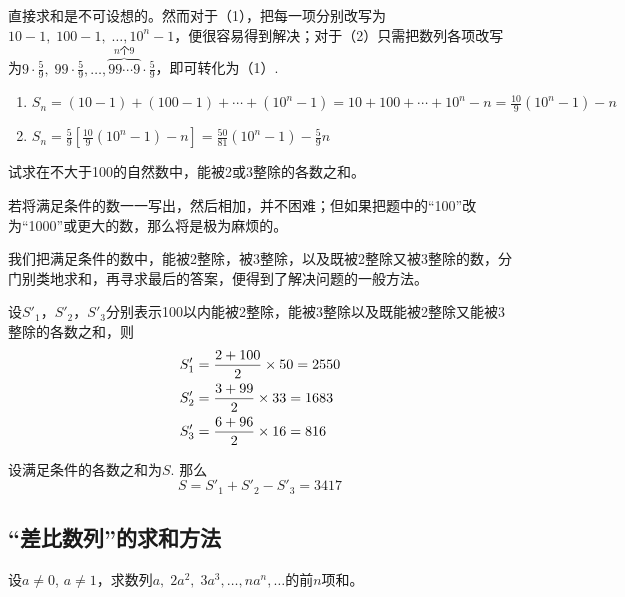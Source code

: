 \begin{analyze}
直接求和是不可设想的。然而对于（1），把每一项分别改写为$10-1,\; 100-1,\; \ldots,10^n-1$，便很容易得到解决；对于（2）只需把数列各项改写为$9\cdot\frac{5}{9},\; 99\cdot\frac{5}{9},\ldots, \overbrace{99\cdots 9}^{\text{$n$个9}}\cdot\frac{5}{9}$，即可转化为（1）.
\end{analyze}

\begin{solution}
\begin{enumerate}[(1)]
    \item $S_n=(10-1)+(100-1)+\cdots +(10^n-1)=10+100+\cdots+10^n - n=\frac{10}{9}(10^n-1)-n$
\item $S_n=\frac{5}{9}\left[\frac{10}{9}(10^n-1)-n\right]=\frac{50}{81}(10^n-1)-\frac{5}{9}n$
\end{enumerate}
\end{solution}


\begin{example}
    试求在不大于100的自然数中，能被2或3整除的各数之和。
\end{example}

\begin{analyze}
若将满足条件的数一一写出，然后相加，并不困难；但如果把题中的“100”改为“1000”或更大的数，那么将是极为麻烦的。

我们把满足条件的数中，能被2整除，被3整除，以及既被2整除又被3整除的数，分门别类地求和，再寻求最后的答案，便得到了解决问题的一般方法。
\end{analyze}

\begin{solution}
设$S'_1$，$S'_2$，$S'_3$分别表示100以内能被2整除，能被3整除以及既能被2整除又能被3整除的各数之和，则    
\[\begin{split}
    S'_1&=\dfrac{2+100}{2}\times 50=2550\\
    S'_2&=\dfrac{3+99}{2}\times 33=1683\\
    S'_3&=\dfrac{6+96}{2}\times 16=816\\
\end{split}\]

设满足条件的各数之和为$S$. 那么
\[S=S'_1+S'_2-S'_3=3417\]
\end{solution}

\subsection{“差比数列”的求和方法}



\begin{example}
    设$a\ne 0$, $a\ne 1$，求数列$a,\; 2a^2,\; 3a^3,\ldots,na^n,\ldots$的前$n$项和。
\end{example}

